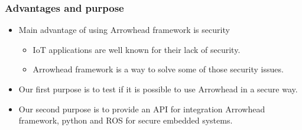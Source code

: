 \begin{frame}
    \frametitle{Advantages and purpose}
    \begin{itemize}
        \item Main advantage of using Arrowhead framework is security
            \begin{itemize}
                \item IoT applications are well known for their lack of security.
                \item Arrowhead framework is a way to solve some of those security issues.
            \end{itemize}
        \item Our first purpose is to test if it is possible to use Arrowhead in a secure way.
        \item Our second purpose is to provide an API for integration Arrowhead framework, python and ROS for secure embedded systems.
    \end{itemize}
\end{frame}
